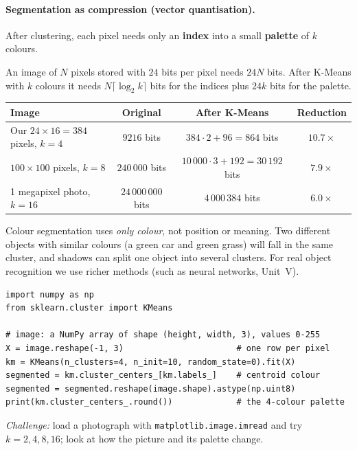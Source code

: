 \paragraph{Segmentation as compression (vector quantisation).} After clustering, each pixel needs only an \textbf{index} into a small \textbf{palette} of $k$ colours.

\begin{example}
An image of $N$ pixels stored with $24$ bits per pixel needs $24N$ bits. After K-Means with $k$ colours it needs $N\lceil\log_2k\rceil$ bits for the indices plus $24k$ bits for the palette.

\medskip
\begin{center}
\begin{tabular}{@{}lccc@{}}
\toprule
\textbf{Image} & \textbf{Original} & \textbf{After K-Means} & \textbf{Reduction}\\
\midrule
Our $24\times16=384$ pixels, $k=4$ & $9216$ bits & $384\cdot2+96=864$ bits & $10.7\times$\\
$100\times100$ pixels, $k=8$ & $240\,000$ bits & $10\,000\cdot3+192=30\,192$ bits & $7.9\times$\\
1 megapixel photo, $k=16$ & $24\,000\,000$ bits & $4\,000\,384$ bits & $6.0\times$\\
\bottomrule
\end{tabular}
\end{center}
\end{example}

\begin{warning}
Colour segmentation uses \emph{only colour}, not position or meaning. Two different objects with similar colours (a green car and green grass) will fall in the same cluster, and shadows can split one object into several clusters. For real object recognition we use richer methods (such as neural networks, Unit~V).
\end{warning}

\begin{tryit}
\begin{lstlisting}
import numpy as np
from sklearn.cluster import KMeans

# image: a NumPy array of shape (height, width, 3), values 0-255
X = image.reshape(-1, 3)                       # one row per pixel
km = KMeans(n_clusters=4, n_init=10, random_state=0).fit(X)
segmented = km.cluster_centers_[km.labels_]    # centroid colour
segmented = segmented.reshape(image.shape).astype(np.uint8)
print(km.cluster_centers_.round())             # the 4-colour palette
\end{lstlisting}
\emph{Challenge:} load a photograph with \texttt{matplotlib.image.imread} and try $k=2,4,8,16$; look at how the picture and its palette change.
\end{tryit}

